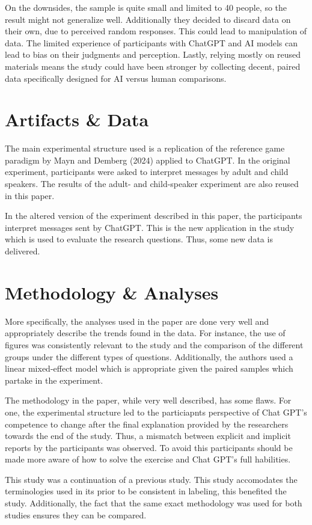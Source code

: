 \documentclass[12pt]{article}
\begin{document}
On the downsides, the sample is quite small and limited to 40 people, so the result might not generalize well. Additionally they decided to discard data on their own, due to perceived random responses. This could lead to manipulation of data. The limited experience of participants with ChatGPT and AI models can lead to bias on their judgments and perception. Lastly, relying mostly on reused materials means the study could have been stronger by collecting decent, paired data specifically designed for AI versus human comparisons.


\section{Artifacts \& Data}
The main experimental structure used is a replication of the reference game paradigm by Mayn and Demberg (2024) applied to ChatGPT. In the original experiment, participants were asked to interpret messages by adult and child speakers. The results of the adult- and child-speaker experiment are also reused in this paper. 

In the altered version of the experiment described in this paper, the participants interpret messages sent by ChatGPT. This is the new application in the study which is used to evaluate the research questions. Thus, some new data is delivered.


\section{Methodology \& Analyses}
More specifically, the analyses used in the paper are done very well and appropriately describe the trends found in the data. For instance, the use of figures was consistently relevant to the study and the comparison of the different groups under the different types of questions. Additionally, the authors used a linear mixed-effect model which is appropriate given the paired samples which partake in the experiment. 

The methodology in the paper, while very well described, has some flaws. For one, the experimental structure led to the particiapnts perspective of Chat GPT's competence to change after the final explanation provided by the researchers towards the end of the study. Thus, a mismatch between explicit and implicit reports by the participants was observed. To avoid this participants should be made more aware of how to solve the exercise and Chat GPT's full habilities. 

This study was a continuation of a previous study. This study accomodates the terminologies used in its prior to be consistent in labeling, this benefited the study. Additionally, the fact that the same exact methodology was used for both studies ensures they can be compared. 
\end{document}
